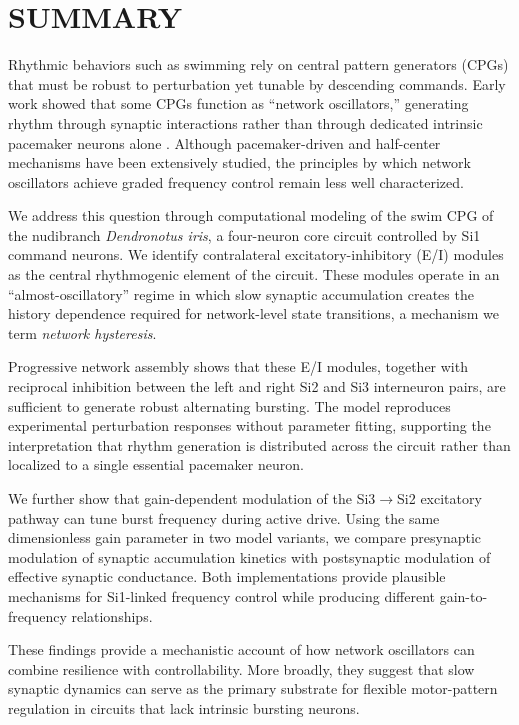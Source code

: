 \section*{SUMMARY}

Rhythmic behaviors such as swimming rely on central pattern generators (CPGs) that must be robust to perturbation yet tunable by descending commands.
Early work showed that some CPGs function as ``network oscillators,'' generating rhythm through synaptic interactions rather than through dedicated intrinsic pacemaker neurons alone \cite{Getting1983delayed, Getting1989}.
Although pacemaker-driven and half-center mechanisms have been extensively studied, the principles by which network oscillators achieve graded frequency control remain less well characterized.

We address this question through computational modeling of the swim CPG of the nudibranch \textit{Dendronotus iris}, a four-neuron core circuit controlled by Si1 command neurons.
We identify contralateral excitatory-inhibitory (E/I) modules as the central rhythmogenic element of the circuit.
These modules operate in an ``almost-oscillatory'' regime in which slow synaptic accumulation creates the history dependence required for network-level state transitions, a mechanism we term \textit{network hysteresis}.

Progressive network assembly shows that these E/I modules, together with reciprocal inhibition between the left and right Si2 and Si3 interneuron pairs, are sufficient to generate robust alternating bursting.
The model reproduces experimental perturbation responses without parameter fitting, supporting the interpretation that rhythm generation is distributed across the circuit rather than localized to a single essential pacemaker neuron.

We further show that gain-dependent modulation of the Si3$\to$Si2 excitatory pathway can tune burst frequency during active drive.
Using the same dimensionless gain parameter in two model variants, we compare presynaptic modulation of synaptic accumulation kinetics with postsynaptic modulation of effective synaptic conductance.
Both implementations provide plausible mechanisms for Si1-linked frequency control while producing different gain-to-frequency relationships.

These findings provide a mechanistic account of how network oscillators can combine resilience with controllability.
More broadly, they suggest that slow synaptic dynamics can serve as the primary substrate for flexible motor-pattern regulation in circuits that lack intrinsic bursting neurons.
